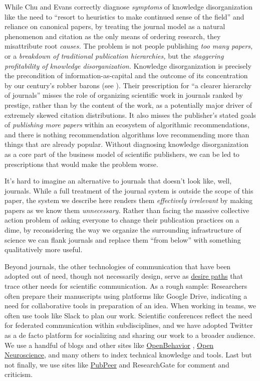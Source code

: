 While Chu and Evans \citep{chuSlowedCanonicalProgress2021} 
correctly diagnose \emph{symptoms} of knowledge disorganization like the
need to ``resort to heuristics to make continued sense of the field''
and reliance on canonical papers, by treating the journal model as a
natural phenomenon and citation as the only means of ordering research,
they misattribute root \emph{causes.} The problem is not people
publishing \emph{too many papers,} or a \emph{breakdown of traditional
publication hierarchies,} but the \emph{staggering profitability of
knowledge disorganization.} Knowledge disorganization is precisely the
precondition of information-as-capital and the outcome of its
concentration by our century's robber barons (see \citep{ellenwoodInformationHasValue2020} ). Their prescription for ``a
clearer hierarchy of journals'' misses the role of organizing scientific
work in journals ranked by prestige, rather than by the content of the
work, as a potentially major driver of extremely skewed citation
distributions. It also misses the publisher's stated goals of
\emph{publishing more papers} within an ecosystem of algorithmic
recommendations, and there is nothing recommendation algorithms love
recommending more than things that are already popular. Without
diagnosing knowledge disorganization as a core part of the business
model of scientific publishers, we can be led to prescriptions that
would make the problem worse.

It's hard to imagine an alternative to journals that doesn't look like,
well, journals. While a full treatment of the journal system is outside
the scope of this paper, the system we describe here renders them
\emph{effectively irrelevant} by making papers as we know them
\emph{unnecessary.} Rather than facing the massive collective action
problem of asking everyone to change their publication practices on a
dime, by reconsidering the way we organize the surrounding
infrastructure of science we can flank journals and replace them ``from
below'' with something qualitatively more useful.

Beyond journals, the other technologies of communication that have been
adopted out of need, though not necessarily design, serve as
\href{https://en.wikipedia.org/wiki/Desire_path}{desire paths} that
trace other needs for scientific communication. As a rough sample:
Researchers often prepare their manuscripts using platforms like Google
Drive, indicating a need for collaborative tools in preparation of an
idea. When working in teams, we often use tools like Slack to plan our
work. Scientific conferences reflect the need for federated
communication within subdisciplines, and we have adopted Twitter as a de
facto platform for socializing and sharing our work to a broader
audience. We use a handful of blogs and other sites like
\href{https://edspace.american.edu/openbehavior/}{OpenBehavior} \citep{whiteFutureOpenOpenSource2019} ,
\href{https://open-neuroscience.com/}{Open Neuroscience}, and many
others to index technical knowledge and tools. Last but not finally, we
use sites like \href{https://pubpeer.com}{PubPeer} and ResearchGate for
comment and criticism.

